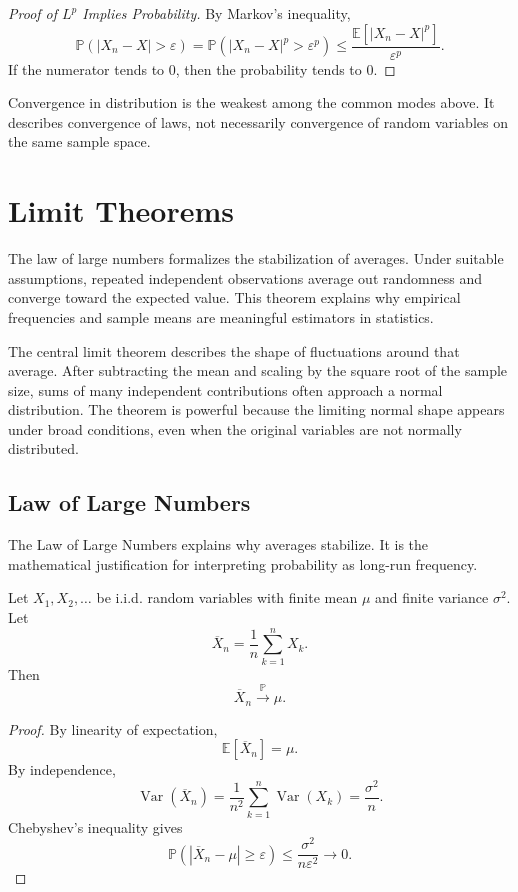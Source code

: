 \begin{proof}[Proof of $L^p$ Implies Probability]
By Markov's inequality,
\[
    \mathbb{P}(|X_n-X|>\varepsilon)
    =\mathbb{P}(|X_n-X|^p>\varepsilon^p)
    \leq\frac{\mathbb{E}[|X_n-X|^p]}{\varepsilon^p}.
\]
If the numerator tends to $0$, then the probability tends to $0$.
\end{proof}

\begin{remark}
Convergence in distribution is the weakest among the common modes above. It describes convergence of laws, not necessarily convergence of random variables on the same sample space.
\end{remark}

\section{Limit Theorems}


The law of large numbers formalizes the stabilization of averages. Under suitable assumptions, repeated independent observations average out randomness and converge toward the expected value. This theorem explains why empirical frequencies and sample means are meaningful estimators in statistics.

The central limit theorem describes the shape of fluctuations around that average. After subtracting the mean and scaling by the square root of the sample size, sums of many independent contributions often approach a normal distribution. The theorem is powerful because the limiting normal shape appears under broad conditions, even when the original variables are not normally distributed.

\subsection{Law of Large Numbers}

The Law of Large Numbers explains why averages stabilize. It is the mathematical justification for interpreting probability as long-run frequency.

\begin{theorem}
Let $X_1,X_2,\dots$ be i.i.d. random variables with finite mean $\mu$ and finite variance $\sigma^2$. Let
\[
    \overline{X}_n=\frac{1}{n}\sum_{k=1}^{n}X_k.
\]
Then
\[
    \overline{X}_n\xrightarrow{\mathbb{P}}\mu.
\]
\end{theorem}

\begin{proof}
By linearity of expectation,
\[
    \mathbb{E}[\overline{X}_n]=\mu.
\]
By independence,
\[
    \operatorname{Var}(\overline{X}_n)=\frac{1}{n^2}\sum_{k=1}^{n}\operatorname{Var}(X_k)=\frac{\sigma^2}{n}.
\]
Chebyshev's inequality gives
\[
    \mathbb{P}(|\overline{X}_n-\mu|\geq\varepsilon)
    \leq\frac{\sigma^2}{n\varepsilon^2}\to 0.
\]
\end{proof}

